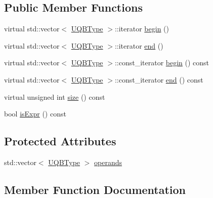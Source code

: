 \subsection*{Public Member Functions}
\begin{DoxyCompactItemize}
\item 
virtual std\+::vector$<$ \hyperlink{namespaceQuickMath_af54af2708effd817452548da857ba076}{U\+Q\+B\+Type} $>$\+::iterator \hyperlink{classQuickMath_1_1QBExpr_a9f06f1ffed9764fe1ad22f2188bfd2e6}{begin} ()
\item 
virtual std\+::vector$<$ \hyperlink{namespaceQuickMath_af54af2708effd817452548da857ba076}{U\+Q\+B\+Type} $>$\+::iterator \hyperlink{classQuickMath_1_1QBExpr_a5ada70c2592cbd4f5fae81d675d52c5e}{end} ()
\item 
virtual std\+::vector$<$ \hyperlink{namespaceQuickMath_af54af2708effd817452548da857ba076}{U\+Q\+B\+Type} $>$\+::const\+\_\+iterator \hyperlink{classQuickMath_1_1QBExpr_a211c9edaff75febc84dd902ad3d3e110}{begin} () const 
\item 
virtual std\+::vector$<$ \hyperlink{namespaceQuickMath_af54af2708effd817452548da857ba076}{U\+Q\+B\+Type} $>$\+::const\+\_\+iterator \hyperlink{classQuickMath_1_1QBExpr_ab086e39434c516344e860457078dd529}{end} () const 
\item 
virtual unsigned int \hyperlink{classQuickMath_1_1QBExpr_a96b0038b62c74a0cb0d89885c0858168}{size} () const 
\item 
bool \hyperlink{classQuickMath_1_1QBExpr_a08e89c086e7cafce312c5766691a404a}{is\+Expr} () const 
\end{DoxyCompactItemize}
\subsection*{Protected Attributes}
\begin{DoxyCompactItemize}
\item 
std\+::vector$<$ \hyperlink{namespaceQuickMath_af54af2708effd817452548da857ba076}{U\+Q\+B\+Type} $>$ \hyperlink{classQuickMath_1_1QBExpr_ad3cff7ae0f5496d8e09990a66a395237}{operands}
\end{DoxyCompactItemize}


\subsection{Member Function Documentation}
\hypertarget{classQuickMath_1_1QBExpr_a9f06f1ffed9764fe1ad22f2188bfd2e6}{}
